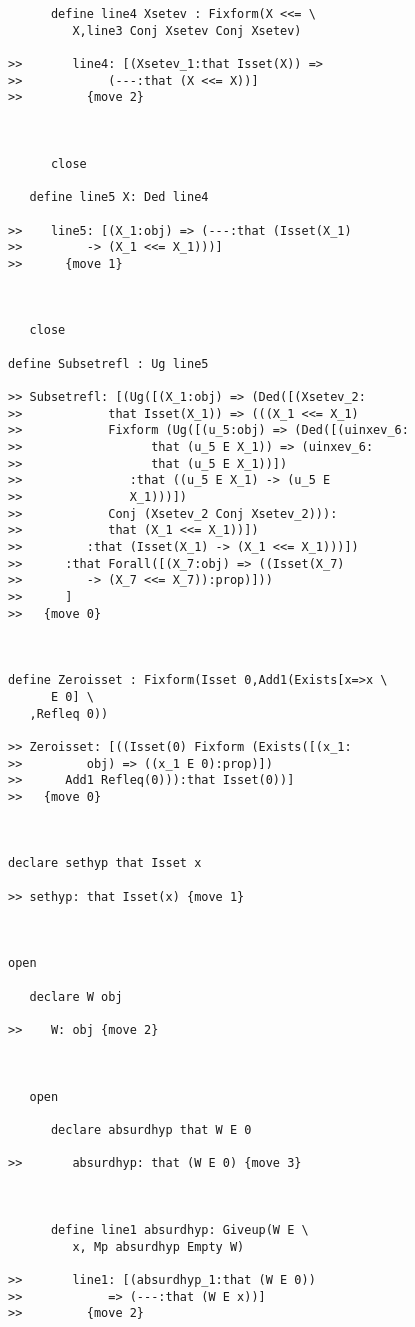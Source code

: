 \documentclass[12pt]{article}
\begin{document}
\begin{verbatim}
      define line4 Xsetev : Fixform(X <<= \
         X,line3 Conj Xsetev Conj Xsetev)

>>       line4: [(Xsetev_1:that Isset(X)) =>
>>            (---:that (X <<= X))]
>>         {move 2}



      close

   define line5 X: Ded line4

>>    line5: [(X_1:obj) => (---:that (Isset(X_1)
>>         -> (X_1 <<= X_1)))]
>>      {move 1}



   close

define Subsetrefl : Ug line5

>> Subsetrefl: [(Ug([(X_1:obj) => (Ded([(Xsetev_2:
>>            that Isset(X_1)) => (((X_1 <<= X_1)
>>            Fixform (Ug([(u_5:obj) => (Ded([(uinxev_6:
>>                  that (u_5 E X_1)) => (uinxev_6:
>>                  that (u_5 E X_1))])
>>               :that ((u_5 E X_1) -> (u_5 E
>>               X_1)))])
>>            Conj (Xsetev_2 Conj Xsetev_2))):
>>            that (X_1 <<= X_1))])
>>         :that (Isset(X_1) -> (X_1 <<= X_1)))])
>>      :that Forall([(X_7:obj) => ((Isset(X_7)
>>         -> (X_7 <<= X_7)):prop)]))
>>      ]
>>   {move 0}



define Zeroisset : Fixform(Isset 0,Add1(Exists[x=>x \
      E 0] \
   ,Refleq 0))

>> Zeroisset: [((Isset(0) Fixform (Exists([(x_1:
>>         obj) => ((x_1 E 0):prop)])
>>      Add1 Refleq(0))):that Isset(0))]
>>   {move 0}



declare sethyp that Isset x

>> sethyp: that Isset(x) {move 1}



open

   declare W obj

>>    W: obj {move 2}



   open

      declare absurdhyp that W E 0

>>       absurdhyp: that (W E 0) {move 3}



      define line1 absurdhyp: Giveup(W E \
         x, Mp absurdhyp Empty W)

>>       line1: [(absurdhyp_1:that (W E 0))
>>            => (---:that (W E x))]
>>         {move 2}




\end{verbatim}
\end{document}
